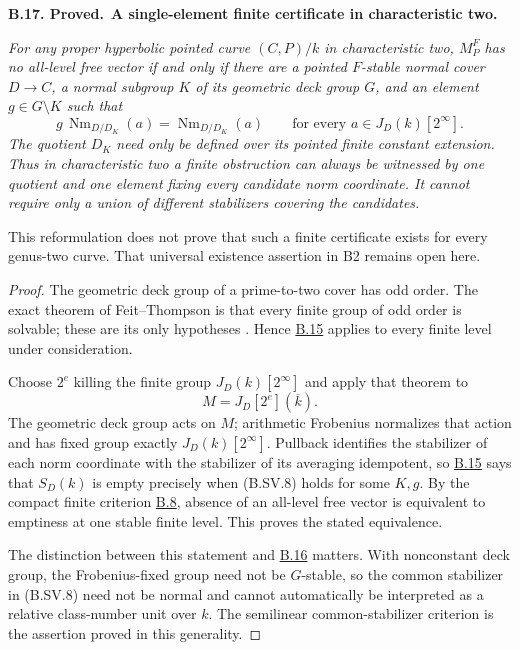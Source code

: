 \documentclass[11pt,a4paper]{article}
\newenvironment{claim}[3]{\par\medskip\noindent\hypertarget{#1}{\textbf{#1. #2.}}\ \textbf{#3.}\par\nopagebreak\smallskip\begingroup\itshape}{\endgroup\par\smallskip}
\newcommand{\statementref}[1]{\hyperlink{#1}{#1}}
\begin{document}
\begin{claim}{B.17}{Proved}{A single-element finite certificate in characteristic two}
For any proper hyperbolic pointed curve $(C,P)/k$ in
characteristic two, $M_P^F$ has no all-level free vector if
and only if there are a pointed $F$-stable normal cover
$D\to C$, a normal subgroup $K$ of its geometric deck group
$G$, and an element $g\in G\setminus K$ such that
\[
 g\,\operatorname{Nm}_{D/D_K}(a)
       =\operatorname{Nm}_{D/D_K}(a)
        \qquad\text{for every }a\in J_D(k)[2^\infty].          \tag{B.SV.8}
\]
The quotient $D_K$ need only be defined over its pointed
finite constant extension. Thus in characteristic two a
finite obstruction can always be witnessed by one quotient
and one element fixing every candidate norm coordinate.
It cannot require only a union of different stabilizers
covering the candidates.

This reformulation does not prove that such a finite
certificate exists for every genus-two curve. That universal
existence assertion in B2 remains open here.
\end{claim}
\begin{proof}
The geometric deck group of a prime-to-two cover has odd
order. The exact theorem of Feit--Thompson is that every
finite group of odd order is solvable; these are its only
hypotheses \citep[Chapter~I, \S1, p.~775, unnumbered main
theorem]{FeitThompson1963}. Hence \statementref{B.15} applies
to every finite level under consideration.

Choose $2^e$ killing the finite group $J_D(k)[2^\infty]$
and apply that theorem to
\[
                      M=J_D[2^e](\overline k).
\]
The geometric deck group acts on $M$; arithmetic Frobenius
normalizes that action and has fixed group exactly
$J_D(k)[2^\infty]$. Pullback identifies the stabilizer of
each norm coordinate with the stabilizer of its averaging
idempotent, so \statementref{B.15} says that $S_D(k)$
is empty precisely when (B.SV.8) holds for some $K,g$.
By the compact finite criterion \statementref{B.8}, absence
of an all-level free vector is equivalent to emptiness at
one stable finite level. This proves the stated equivalence.

The distinction between this statement and
\statementref{B.16} matters. With nonconstant deck group,
the Frobenius-fixed group need not be $G$-stable, so the
common stabilizer in (B.SV.8) need not be normal and cannot
automatically be interpreted as a relative class-number unit
over $k$. The semilinear common-stabilizer criterion is the
assertion proved in this generality.
\end{proof}
\end{document}
